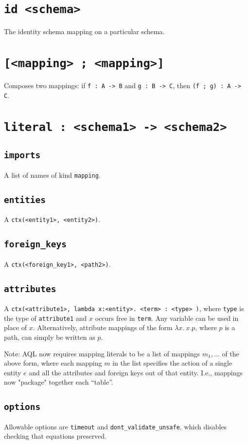 \documentclass[10pt]{book}
\begin{document}
\section{{\tt id <schema>}}
The identity schema mapping on a particular schema.

\section{{\tt [<mapping> ; <mapping>]}}
Composes two mappings: if {\tt f : A -> B} and {\tt g : B -> C}, then {\tt (f ; g) : A -> C}.

\section{{\tt literal : <schema1> -> <schema2>}}
\subsection{{\tt imports}}
A list of names of kind {\tt mapping}.
\subsection{{\tt entities}}
A {\tt ctx(<entity1>, <entity2>)}.
\subsection{{\tt foreign\_keys}}
A {\tt ctx(<foreign\_key1>, <path2>)}.  
\subsection{{\tt attributes}}
A {\tt ctx(<attribute1>, lambda x:<entity>. <term> : <type> )}, where {\tt type} is the type of {\tt attribute1} and $x$ occurs free in {\tt term}.  Any variable can be used in place of $x$.  Alternatively, attribute mappings of the form $\lambda x. \ x.p$, where $p$ is a path, can simply be written as $p$.

Note: AQL now requires mapping literals to be a list of mappings $m_1, \ldots$ of the above form, where each mapping $m$ in the list specifies the action of a single entity $e$ and all the attributes and foreign keys out of that entity.  I.e., mappings now  "package" together each ``table''. 

\subsection{{\tt options}}
Allowable options are {\tt timeout} and {\tt dont\_validate\_unsafe}, which disables checking that equations preserved.
\end{document}
